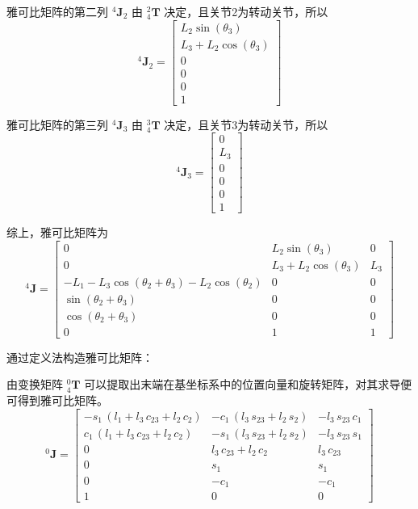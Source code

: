 \documentclass{homework}
\begin{document}
\begin{sol}
雅可比矩阵的第二列 $ {^4}\mathbf{J}_2 $ 由 $ _4^2\mathbf{T} $ 决定，且关节2为转动关节，所以
\[
  {^4}\mathbf{J}_2 =
  \begin{bmatrix}
    L_2 \sin(\theta_3) \\
    L_3 + L_2 \cos(\theta_3) \\
    0 \\
    0 \\
    0 \\
    1
  \end{bmatrix}
\]

雅可比矩阵的第三列 $ {^4}\mathbf{J}_3 $ 由 $ _4^3\mathbf{T} $ 决定，且关节3为转动关节，所以
\[
  {^4}\mathbf{J}_3 =
  \begin{bmatrix}
    0 \\
    L_3 \\
    0 \\
    0 \\
    0 \\
    1
  \end{bmatrix}
\]

综上，雅可比矩阵为
\[
  {^4}\mathbf{J} =
  \begin{bmatrix}
    0 & L_2 \sin(\theta_3) & 0 \\
    0 & L_3 + L_2 \cos(\theta_3) & L_3 \\
    - L_1 - L_3 \cos(\theta_2 + \theta_3) - L_2 \cos(\theta_2) & 0 & 0 \\
    \sin(\theta_2 + \theta_3) & 0 & 0 \\
    \cos(\theta_2 + \theta_3) & 0 & 0 \\
    0 & 1 & 1
  \end{bmatrix}
\]

通过定义法构造雅可比矩阵：

由变换矩阵 $ _4^0\mathbf{T} $ 可以提取出末端在基坐标系中的位置向量和旋转矩阵，对其求导便可得到雅可比矩阵。
\[
  {^0}\mathbf{J} =
  \begin{bmatrix} 
    -s_{1}\,\left(l_{1}+l_{3}\,c_{23}+l_{2}\,c_{2}\right) & -c_{1}\,\left(l_{3}\,s_{23}+l_{2}\,s_{2}\right) & -l_{3}\,s_{23}\,c_{1} \\ 
    c_{1}\,\left(l_{1}+l_{3}\,c_{23}+l_{2}\,c_{2}\right) & -s_{1}\,\left(l_{3}\,s_{23}+l_{2}\,s_{2}\right) & -l_{3}\,s_{23}\,s_{1} \\ 
    0 & l_{3}\,c_{23}+l_{2}\,c_{2} & l_{3}\,c_{23} \\ 
    0 & s_{1} & s_{1} \\ 
    0 & -c_{1} & -c_{1} \\ 
    1 & 0 & 0
  \end{bmatrix}
\]


\end{sol}
\end{document}
